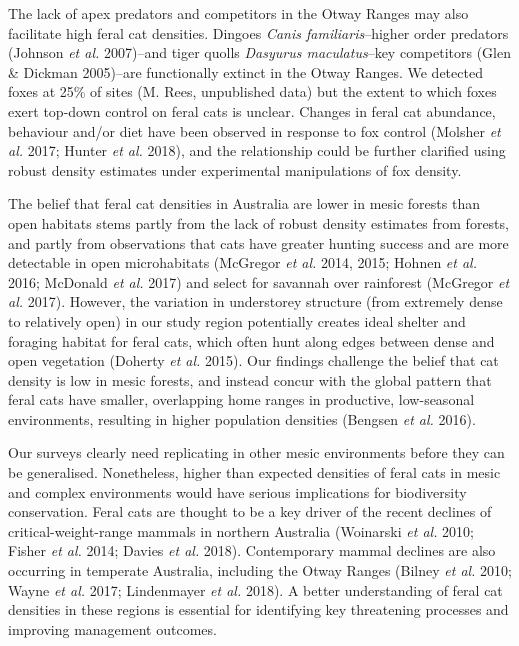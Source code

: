 \documentclass[11pt,a4paper,titlepage,twoside,openright]{style/unimelbthesis}
\begin{document}
\begin{mainmatter}
The lack of apex predators and competitors in the Otway Ranges may also facilitate high feral cat densities. Dingoes \emph{Canis familiaris}--higher order predators (Johnson \emph{et al.} 2007)--and tiger quolls \emph{Dasyurus maculatus}--key competitors (Glen \& Dickman 2005)--are functionally extinct in the Otway Ranges. We detected foxes at 25\% of sites (M. Rees, unpublished data) but the extent to which foxes exert top-down control on feral cats is unclear. Changes in feral cat abundance, behaviour and/or diet have been observed in response to fox control (Molsher \emph{et al.} 2017; Hunter \emph{et al.} 2018), and the relationship could be further clarified using robust density estimates under experimental manipulations of fox density.

The belief that feral cat densities in Australia are lower in mesic forests than open habitats stems partly from the lack of robust density estimates from forests, and partly from observations that cats have greater hunting success and are more detectable in open microhabitats (McGregor \emph{et al.} 2014, 2015; Hohnen \emph{et al.} 2016; McDonald \emph{et al.} 2017) and select for savannah over rainforest (McGregor \emph{et al.} 2017). However, the variation in understorey structure (from extremely dense to relatively open) in our study region potentially creates ideal shelter and foraging habitat for feral cats, which often hunt along edges between dense and open vegetation (Doherty \emph{et al.} 2015). Our findings challenge the belief that cat density is low in mesic forests, and instead concur with the global pattern that feral cats have smaller, overlapping home ranges in productive, low-seasonal environments, resulting in higher population densities (Bengsen \emph{et al.} 2016).

Our surveys clearly need replicating in other mesic environments before they can be generalised. Nonetheless, higher than expected densities of feral cats in mesic and complex environments would have serious implications for biodiversity conservation. Feral cats are thought to be a key driver of the recent declines of critical-weight-range mammals in northern Australia (Woinarski \emph{et al.} 2010; Fisher \emph{et al.} 2014; Davies \emph{et al.} 2018). Contemporary mammal declines are also occurring in temperate Australia, including the Otway Ranges (Bilney \emph{et al.} 2010; Wayne \emph{et al.} 2017; Lindenmayer \emph{et al.} 2018). A better understanding of feral cat densities in these regions is essential for identifying key threatening processes and improving management outcomes.


\end{mainmatter}
\end{document}

